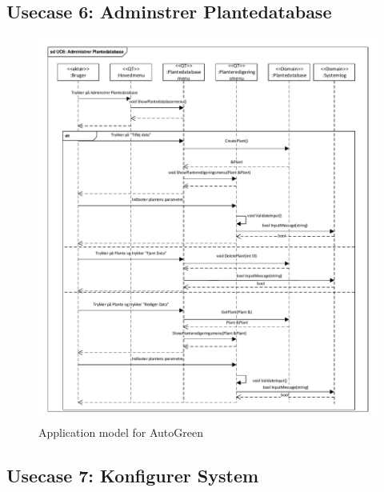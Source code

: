 \clearpage

\subsection{Usecase 6: Adminstrer Plantedatabase}

\begin{figure}[!h]
\centering 
\includegraphics[width={\textwidth-1cm}, trim=0 0 0 0, clip=true] {../fig/SD_autogreen_UC_6_Adminstrer_Plantedatabase.pdf}
\caption{Application model for AutoGreen}
\label{fig:SD_UC6}
\end{figure}

\clearpage

\subsection{Usecase 7: Konfigurer System}

